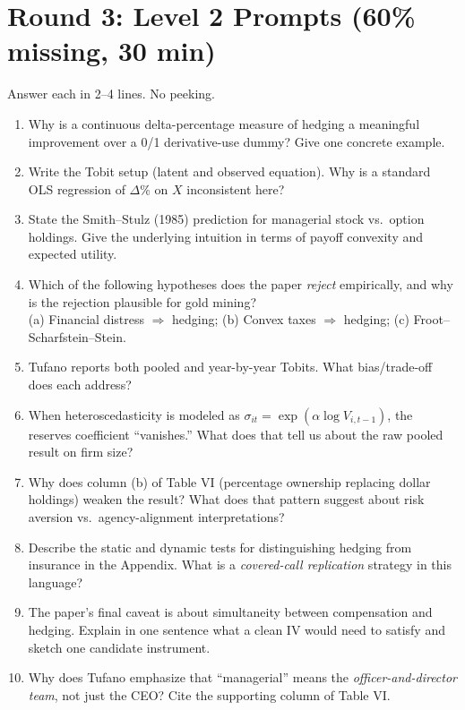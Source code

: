 \documentclass[11pt]{article}
\newcommand{\dP}{\Delta\%}
\begin{document}
\section*{Round 3: Level 2 Prompts (60\% missing, 30 min)}
Answer each in 2--4 lines. No peeking.
\begin{enumerate}
\item Why is a continuous delta-percentage measure of hedging a meaningful improvement over a 0/1 derivative-use dummy? Give one concrete example.
\item Write the Tobit setup (latent and observed equation). Why is a standard OLS regression of $\dP$ on $X$ inconsistent here?
\item State the Smith--Stulz (1985) prediction for managerial stock vs.\ option holdings. Give the underlying intuition in terms of payoff convexity and expected utility.
\item Which of the following hypotheses does the paper \emph{reject} empirically, and why is the rejection plausible for gold mining?\\
 (a) Financial distress $\Rightarrow$ hedging; \quad (b) Convex taxes $\Rightarrow$ hedging; \quad (c) Froot--Scharfstein--Stein.
\item Tufano reports both pooled and year-by-year Tobits. What bias/trade-off does each address?
\item When heteroscedasticity is modeled as $\sigma_{it} = \exp(\alpha \log V_{i,t-1})$, the reserves coefficient ``vanishes.'' What does that tell us about the raw pooled result on firm size?
\item Why does column (b) of Table VI (percentage ownership replacing dollar holdings) weaken the result? What does that pattern suggest about risk aversion vs.\ agency-alignment interpretations?
\item Describe the static and dynamic tests for distinguishing hedging from insurance in the Appendix. What is a \emph{covered-call replication} strategy in this language?
\item The paper's final caveat is about simultaneity between compensation and hedging. Explain in one sentence what a clean IV would need to satisfy and sketch one candidate instrument.
\item Why does Tufano emphasize that ``managerial'' means the \emph{officer-and-director team}, not just the CEO? Cite the supporting column of Table VI.
\end{enumerate}
\end{document}
